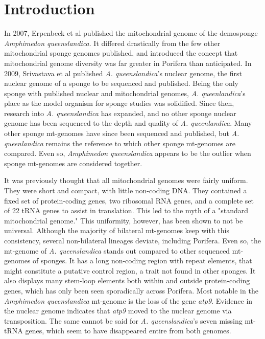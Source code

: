 \documentclass[../main.tex]{subfiles}
\begin{document}
\newpage
\section{Introduction}

In 2007, Erpenbeck et al published the mitochondrial genome of the demosponge \emph{Amphimedon queenslandica}. It differed drastically from the few other mitochondrial sponge genomes published, and introduced the concept that mitochondrial genome diversity was far greater in Porifera than anticipated. In 2009, Srivastava et al published \emph{A. queenslandica}'s nuclear genome, the first nuclear genome of a sponge to be sequenced and published. Being the only sponge with published nuclear and mitochondrial genomes, \emph{A. queenlandica}'s place as the model organism for sponge studies was solidified. Since then, research into \emph{A. queenslandica} has expanded, and no other sponge nuclear genome has been sequenced to the depth and quality of \emph{A. queenlandica}. Many other sponge mt-genomes have since been sequenced and published, but \emph{A. queenlandica} remains the reference to which other sponge mt-genomes are compared. Even so, \emph{Amphimedon queenslandica} appears to be the outlier when sponge mt-genomes are considered together.

It was previously thought that all mitochondrial genomes were fairly uniform. They were short and compact, with little non-coding DNA. They contained a fixed set of protein-coding genes, two ribosomal RNA genes, and a complete set of 22 tRNA genes to assist in translation. This led to the myth of a "standard mitochondrial genome." This uniformity, however, has been shown to not be universal. Although the majority of bilateral mt-genomes keep with this consistency, several non-bilateral lineages deviate, including Porifera. Even so, the mt-genome of \emph{A. queenslandica} stands out compared to other sequenced mt-genomes of sponges. It has a long non-coding region with repeat elements, that might constitute a putative control region, a trait not found in other sponges. It also displays many stem-loop elements both within and outside protein-coding genes, which has only been seen sporadically across Porifera. Most notable in the \emph{Amphimedon queenslandica} mt-genome is the loss of the gene \emph{atp9}. Evidence in the nuclear genome indicates that \emph{atp9} moved to the nuclear genome via transposition. The same cannot be said for \emph{A. queenslandica}'s seven missing mt-tRNA genes, which seem to have disappeared entire from both genomes.
\end{document}
